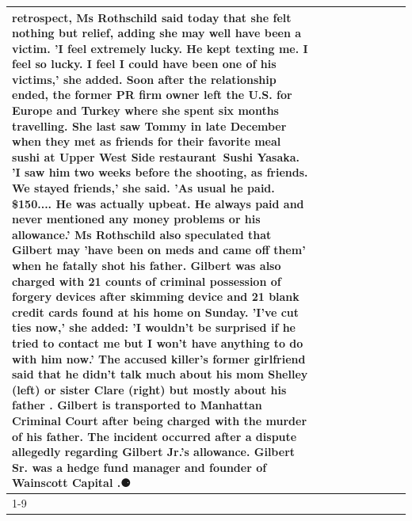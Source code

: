 \begin{table}[H]
\begin{tabular}{lllrlllll}
retrospect, Ms Rothschild said today that she felt nothing but relief, adding she may well have been a victim. 'I feel extremely lucky. He kept texting me. I feel so lucky. I feel I could have been one of his victims,' she added. Soon after the relationship ended, the former PR firm owner left the U.S. for Europe and Turkey where she spent six months  travelling. She last saw Tommy in late December when they met as friends for their favorite meal sushi at Upper West Side restaurant Sushi Yasaka. 'I saw him two weeks before the shooting, as friends. We stayed friends,' she said. 'As usual he paid. \$150.... He was actually upbeat. He always paid and never mentioned any money problems or his allowance.' Ms Rothschild also speculated that Gilbert may 'have been on meds and came off them' when he fatally shot his father. Gilbert was also charged with 21 counts of criminal possession of forgery devices after skimming device and 21 blank credit cards found at his home on Sunday. 'I've cut ties now,' she added: 'I wouldn’t be surprised if he tried to contact me but I won’t have anything to do with him now.' The accused killer's former girlfriend said that he didn't talk much about his mom Shelley (left) or sister Clare (right) but mostly about his father . Gilbert is transported to Manhattan Criminal Court  after being charged with the murder of his father. The incident occurred after a dispute allegedly regarding Gilbert Jr.'s allowance. Gilbert Sr. was a hedge fund manager and founder of Wainscott Capital .⚈ \\
\cline{1-9} \cline{2-9}

\end{tabular}
\end{table}

